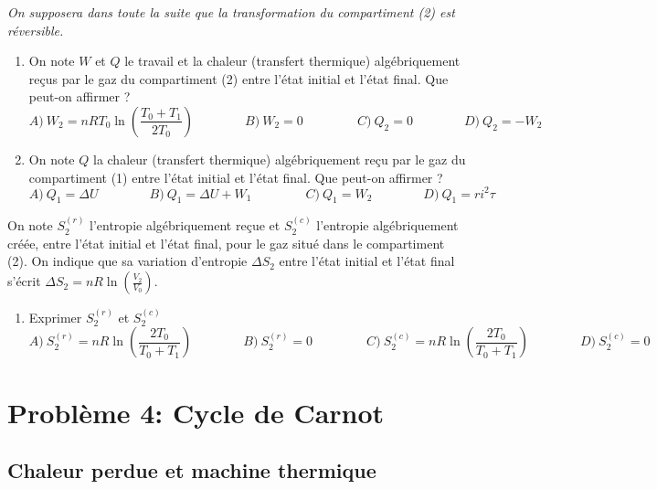 \documentclass[
  10pt,
  french,
  a4paper,
  DIV=18]{scrartcl}
\providecommand{\tightlist}{%
  \setlength{\itemsep}{0pt}\setlength{\parskip}{0pt}}
\begin{document}
\emph{On supposera dans toute la suite que la transformation du
compartiment (2) est réversible.}

\begin{enumerate}
\def\labelenumi{\arabic{enumi}.}
\setcounter{enumi}{3}
\item
  On note \(W\) et \(Q\) le travail et la chaleur (transfert thermique)
  algébriquement reçus par le gaz du compartiment (2) entre l'état
  initial et l'état final. Que peut-on affirmer ?
  \[ A) \ W_2 = nRT_0\ln\left(\frac{T_0 + T_1}{2T_0}\right) \qquad\qquad B) \ W_2 = 0 \ \qquad\qquad C) \ Q_2 = 0 \qquad\qquad D) \ Q_2 = -W_2\]
\item
  On note \(Q\) la chaleur (transfert thermique) algébriquement reçu par
  le gaz du compartiment (1) entre l'état initial et l'état final. Que
  peut-on affirmer ?
  \[ A) \ Q_1 = \Delta U \qquad\qquad B) \ Q_1 = \Delta U + W_1 \ \qquad\qquad C) \ Q_1 = W_2 \qquad\qquad D) \ Q_1 = ri^2\tau\]
\end{enumerate}

On note \(S_2^{(r)}\) l'entropie algébriquement reçue et \(S_2^{(c)}\)
l'entropie algébriquement créée, entre l'état initial et l'état final,
pour le gaz situé dans le compartiment (2). On indique que sa variation
d'entropie \(\Delta S_2\) entre l'état initial et l'état final s'écrit
\(\Delta S_2 = nR \ln\left(\frac{V_2}{V_0}\right)\).

\begin{enumerate}
\def\labelenumi{\arabic{enumi}.}
\setcounter{enumi}{5}
\tightlist
\item
  Exprimer \(S_2^{(r)}\) et \(S_2^{(c)}\)
  \[ A) \ S_2^{(r)} = nR\ln\left(\frac{2T_0}{T_0 + T_1}\right) \qquad\qquad B) \ S_2^{(r)} = 0 \ \qquad\qquad C) \ S_2^{(c)} = nR\ln\left(\frac{2T_0}{T_0 + T_1}\right) \qquad\qquad D) \ S_2^{(c)} = 0\]
\end{enumerate}

\section*{Problème 4: Cycle de
Carnot}\label{probluxe8me-4-cycle-de-carnot}

\subsection*{Chaleur perdue et machine
thermique}\label{chaleur-perdue-et-machine-thermique}
\end{document}

